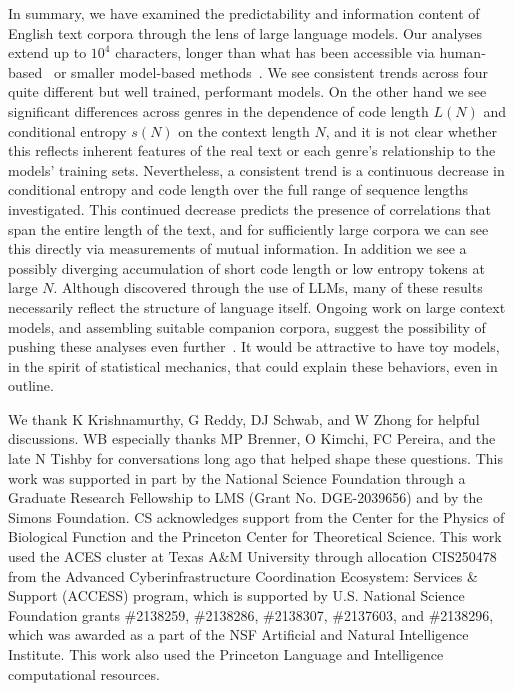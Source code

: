 \documentclass[aps,twocolumn,floats,prx]{revtex4}
\begin{document}
In summary, we have examined the predictability and information content of English text corpora through the lens of large language models.   Our analyses extend up to $10^{4}$ characters, longer than what has been accessible via human-based~\cite{Shannon_1951,Cover+King_1978} or smaller model-based methods~\cite{Brown1982estimate,noteL,Takahira2016entropy}.  We see consistent trends across four quite different but well trained, performant models. On the other hand we see significant differences across genres in the dependence of code length $L(N)$ and conditional entropy $s(N)$ on the context length $N$, and it is not clear whether this reflects inherent features of the real text or each genre's relationship to the models' training sets.  Nevertheless, a consistent trend is a continuous decrease in conditional entropy and code length over the full range of sequence lengths investigated. This continued decrease predicts the presence of correlations that span the entire length of the text, and for sufficiently large corpora  we can see this directly via measurements of mutual information. In addition we see a possibly diverging accumulation of short code length or low entropy tokens at large $N$. Although discovered through the use of LLMs, many of these results necessarily reflect the structure of language itself. Ongoing work on large context models, and assembling suitable companion corpora, suggest the possibility of pushing these analyses even further~\cite{gao2025train}.   It would be attractive to have toy models, in the spirit of statistical mechanics, that could explain these behaviors, even in outline.  

\begin{acknowledgments}
We thank K Krishnamurthy, G Reddy, DJ Schwab, and W Zhong for helpful discussions.  WB especially thanks MP Brenner, O Kimchi, FC Pereira, and the late N Tishby for conversations long ago that helped shape these questions.  This work was supported in part by the National Science Foundation through a Graduate Research Fellowship to LMS (Grant No. DGE-2039656) and by the Simons Foundation.
CS acknowledges support from the Center for the Physics of Biological Function and the Princeton Center for Theoretical Science. This work used the ACES cluster at Texas A{\&}M University through allocation CIS250478 from the Advanced Cyberinfrastructure Coordination Ecosystem: Services \& Support (ACCESS) program, which is supported by U.S. National Science Foundation grants \#2138259, \#2138286, \#2138307, \#2137603, and \#2138296, which was awarded as a part of the NSF Artificial and Natural Intelligence Institute. This work also used the Princeton Language and Intelligence computational resources.
\end{acknowledgments}
\end{document}
